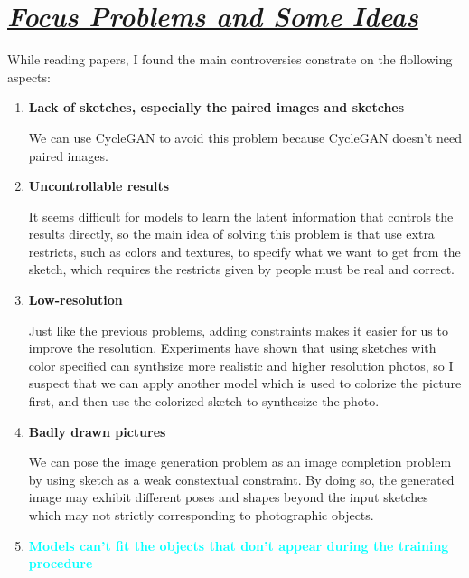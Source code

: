 \documentclass{article}
\begin{document}
\section{\textbf{\underline{\emph{Focus Problems and Some Ideas}}}}

\indent While reading papers, I found the main controversies constrate on the flollowing aspects:

\begin{enumerate}
\item \textbf{Lack of sketches, especially the paired images and sketches}\par
We can use CycleGAN to avoid this problem because CycleGAN doesn't need paired images.


\item \textbf{Uncontrollable results}\par
It seems difficult for models to learn the latent information that controls the results directly, so the main idea of solving this problem is that use extra restricts, such as colors and textures, to specify what we want to get from the sketch, which requires the restricts given by people must be real and correct. 


\item \textbf{Low-resolution}\par
Just like the previous problems, adding constraints makes it easier for us to improve the resolution. Experiments have shown that using sketches with color specified can synthsize more realistic and higher resolution photos, so I suspect that we can apply another model which is used to colorize the picture first, and then use the colorized sketch to synthesize the photo.

\item \textbf{Badly drawn pictures}\par
We can pose the image generation problem as an image completion problem by using sketch as a weak constextual constraint. By doing so, the generated image may exhibit different poses and shapes beyond the input sketches which may not strictly corresponding to photographic objects.




\item \textbf{\textcolor{cyan}{Models can't fit the objects that don't appear during the training procedure}} 
\end{enumerate}





\end{document}

